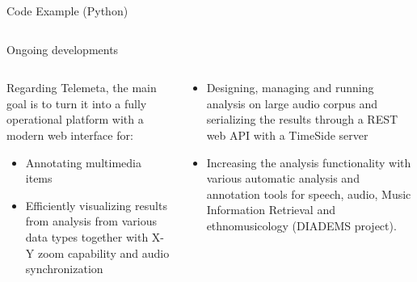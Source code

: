 \documentclass[final, hyperref, table]{beamer}
\begin{document}
\begin{frame}[containsverbatim]{}
\begin{columns}[T]
\begin{column}[T]{.49\linewidth}
\begin{block}{Code Example (Python)}
\begin{columns}[T]
  \begin{column}[T]{0.35\linewidth}
  \end{column}
\end{columns}
  \end{block}

  \begin{block}{Ongoing developments}
    \begin{columns}
      \begin{column}{0.47\linewidth}
        Regarding Telemeta, the main goal is to turn it into a fully operational platform with a modern web interface for:
        \begin{itemize}
        \item \alert{Annotating} multimedia items
        \item Efficiently \alert{visualizing} results from analysis from various data types together with X-Y zoom capability and audio synchronization
        \end{itemize}
      \end{column}
      \begin{column}{0.47\linewidth}
        \begin{itemize}
        \item Designing, managing and running analysis on large audio corpus and serializing the results through a REST web API with a TimeSide server
        \item Increasing the analysis functionality with various automatic analysis and annotation tools for speech, audio, Music Information Retrieval and ethnomusicology (DIADEMS project).
\end{itemize}
      \end{column}
    \end{columns}
    

\end{block}
\end{column}
\end{columns}
\end{frame}
\end{document}
